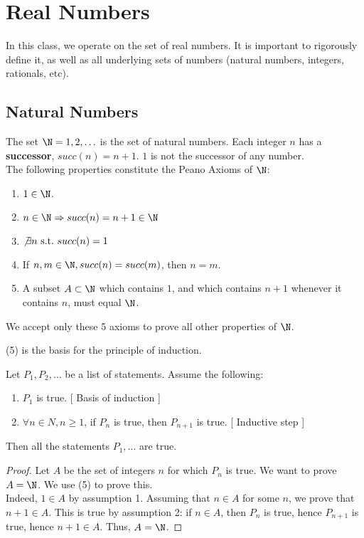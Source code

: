 \documentclass[math1010-lecture-notes]{subfiles}
\begin{document}
\chapter{Real Numbers}
In this class, we operate on the set of real numbers. It is important to rigorously define it, as
well as all underlying sets of numbers (natural numbers, integers, rationals, etc).

\section{Natural Numbers}
\begin{definition}{}
  The set $\N = {1, 2, \ldots}$ is the set of natural numbers. Each integer $n$ has a
  \textbf{successor}, $succ(n) = n + 1$. $1$ is not the successor of any number. \\
  The following properties constitute the Peano Axioms of $\N$:
  \begin{enumerate}
    \item $1\in \N$.
    \item $n\in \N \Rightarrow succ(n)=n+1 \in \N$
    \item $\not\exists n ~\text{s.t.}~ succ(n) = 1$
    \item If $n, m\in \N, succ(n) = succ(m)$, then $n=m$.
    \item A subset $A\subset \N$ which contains $1$, and which contains  $n+1$ whenever it contains
       $n$, must equal $\N$.
  \end{enumerate}
  We accept only these 5 axioms to prove all other properties of $\N$.
\end{definition}
(5) is the basis for the principle of induction.

\begin{theorem}{}
  Let $ P_1, P_2, \ldots$ be a list of statements. Assume the following:
  \begin{enumerate}
    \item $P_1$ is true. [ Basis of induction ] 
    \item $\forall n\in N, n\ge 1$, if $P_n$ is true, then  $P_{n+1}$ is true. [ Inductive step ]
  \end{enumerate}
  Then all the statements $P_1, \ldots$ are true.
\end{theorem}
\begin{proof}[Proof]
  Let $A$ be the set of integers $n$ for which  $P_n$ is true. We want to prove $A=\N$. We use (5)
  to prove this. \\
  Indeed, $1\in A$ by assumption 1. Assuming that $n\in A$ for some $n$, we prove that  $n+1\in A$.
  This is true by assumption 2: if $n\in A$, then $P_n$ is true, hence  $P_{n+1}$ is true, hence
  $n+1\in A$.
  Thus, $A=\N$.
\end{proof}
\end{document}

